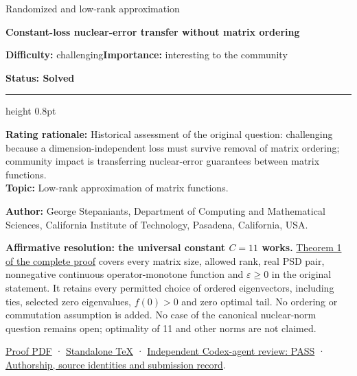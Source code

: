 \documentclass[11pt,a4paper]{article}
\makeatletter
\renewcommand{\subsection}{\Needspace{4\baselineskip}\@startsection{subsection}{2}{0pt}{9pt plus 1pt minus 1pt}{3pt}{\sffamily\bfseries\normalsize\color{ink}}}
\makeatother
\begin{document}
{\sffamily\small\color{muted}Randomized and low-rank approximation\par}
\vspace{3pt}
{\raggedright{}\sffamily\bfseries\fontsize{21}{24}\selectfont\color{ink}Constant-loss
nuclear-error transfer without matrix ordering\par}
\vspace{7pt}
{\sffamily\small\textbf{Difficulty:} challenging\quad\textbf{Importance:} interesting
to the community\par}
{\sffamily\small\bfseries\color{accent}Status: Solved\par}
\vspace{4pt}
{\color{accent}\hrule height 0.8pt}
\vspace{6pt}
\textbf{Rating rationale:} Historical assessment of the original
question: challenging because a dimension-independent loss must survive
removal of matrix ordering; community impact is transferring
nuclear-error guarantees between matrix functions.\\
\textbf{Topic:} Low-rank approximation of matrix functions.

\subsection{Resolution - 2026-09-11}\label{resolution---2026-09-11}

\textbf{Author:} George Stepaniants, Department of Computing and
Mathematical Sciences, California Institute of Technology, Pasadena,
California, USA.

\textbf{Affirmative resolution: the universal constant \(C=11\) works.}
\href{https://github.com/ajt60gaibb/OpenProblemsInNLA/blob/main/randomized-and-low-rank-approximation/RA-10/solution.md}{Theorem
1 of the complete proof} covers every matrix size, allowed rank, real
PSD pair, nonnegative continuous operator-monotone function and
\(\varepsilon\ge0\) in the original statement. It retains every
permitted choice of ordered eigenvectors, including ties, selected zero
eigenvalues, \(f(0)>0\) and zero optimal tail. No ordering or
commutation assumption is added. No case of the canonical nuclear-norm
question remains open; optimality of 11 and other norms are not claimed.

\href{https://github.com/ajt60gaibb/OpenProblemsInNLA/blob/main/randomized-and-low-rank-approximation/RA-10/solution.pdf}{Proof
PDF} ·
\href{https://github.com/ajt60gaibb/OpenProblemsInNLA/blob/main/randomized-and-low-rank-approximation/RA-10/solution.tex}{Standalone
TeX} ·
\href{https://github.com/ajt60gaibb/OpenProblemsInNLA/blob/main/references/stepaniants-ra10-2026-09-11/verification/RA-10-independent-review.md}{Independent
Codex-agent review: PASS} ·
\href{https://github.com/ajt60gaibb/OpenProblemsInNLA/blob/main/references/stepaniants-ra10-2026-09-11/README.md}{Authorship,
source identities and submission record}.
\end{document}
